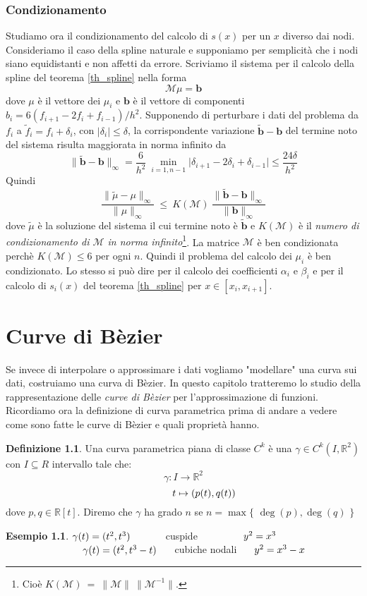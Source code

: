 \documentclass[a4paper,12pt]{report}
\newcommand\tab[1][0.5cm]{\hspace*{#1}}
\newcommand*\from{\colon}
\theoremstyle{definition}
\newtheorem{defin}{Definizione}[chapter]
\newtheorem{es}{Esempio}[chapter]
\newcommand{\norm}[1]{ \lVert {#1} \rVert}
\begin{document}
\subsection{Condizionamento}
Studiamo ora il condizionamento del calcolo di $s(x)$ per un $x$ diverso dai nodi. Consideriamo il caso della spline naturale e supponiamo per semplicità che i nodi siano equidistanti e non affetti da errore. Scriviamo il sistema per il calcolo della spline del teorema \ref{th_spline} nella forma
$$\mathcal{M} \mu = \textbf{b}$$
dove $\mu$ è il vettore dei $\mu_i$ e $\textbf{b}$ è il vettore di componenti $b_i = 6(f_{i+1} - 2f_i + f_{i-1}) / h^2$. Supponendo di perturbare i dati del problema da $f_i$ a $\tilde{f}_i = f_i + \delta_i$, con $\big|\delta_i \big| \le \delta $, la corrispondente variazione $\tilde{\textbf{b}} - \textbf{b}$ del termine noto del sistema risulta maggiorata in norma infinito da 
$$\norm{\tilde{\textbf{b}} - \textbf{b}}_\infty = \frac{6}{h^2} \ \underset{i=1,n-1}{\min} \big|\delta_{i+1} - 2\delta_i + \delta_{i-1} \big| \leq \frac{24 \delta}{h^2}$$
Quindi 
$$\frac{\norm{\tilde{\mu} - \mu}_\infty} {\norm{\mu}_\infty} \ \le \ K(\mathcal{M}) \  \frac{\norm{\tilde{\textbf{b}} - \textbf{b}}_\infty} {\norm{\textbf{b}}_\infty}$$
dove $\tilde{\mu}$ è la soluzione del sistema il cui termine noto è $\tilde{\textbf{b}}$ e $K(\mathcal{M})$ è il \textit{numero di condizionamento di $\mathcal{M}$ in norma infinito}\footnote{Cioè $K(\mathcal{M}) \ = \ \norm{\mathcal{M}} \ \norm{\mathcal{M}^{-1}}$.}. La matrice $\mathcal{M}$ è ben condizionata perchè $K(\mathcal{M}) \le 6$ per ogni $n$. Quindi il problema del calcolo dei $\mu_i$ è ben condizionato. Lo stesso si può dire per il calcolo dei coefficienti $\alpha_i$ e $\beta_i$ e per il calcolo di $s_i(x)$ del teorema \ref{th_spline} per $x \in [x_i,x_{i+1}]$.

\chapter{Curve di Bèzier}
Se invece di interpolare o approssimare i dati vogliamo "modellare" una curva sui dati, costruiamo una curva di Bèzier.
In questo capitolo tratteremo lo studio della rappresentazione delle \textit{curve di Bèzier} per l'approssimazione di funzioni.\\
Ricordiamo ora la definizione di curva parametrica prima di andare a vedere come sono fatte le curve di Bèzier e quali proprietà hanno.
\begin{defin}
	Una curva parametrica piana di classe $C^k$ è  una $\gamma \in C^k(I,\mathbb{R}^2) $ con $I \subseteq R$ intervallo tale che: $$ \gamma \from I \rightarrow \mathbb{R}^2 $$ $$ \ \ \tab \ \ \tab  t\mapsto (p(t),q(t))$$
	dove $p,q \in \mathbb{R}[t]$. Diremo che $\gamma$ ha grado $n$ se $n = \max \{$ $\deg(p) , \deg(q) $ $\}$
\end{defin}
\begin{es}
	$ \gamma(t) = ( t^2 , t^3) \tab \tab \ $ cuspide $\tab \tab \tab  y^2 = x^3$ \\
	$ \tab \tab \tab \tab \tab \ \ \gamma(t) = ( t^2 , t^3-t) \tab $ cubiche nodali $\tab y^2 = x^3-x$
\end{es}
\end{document}

